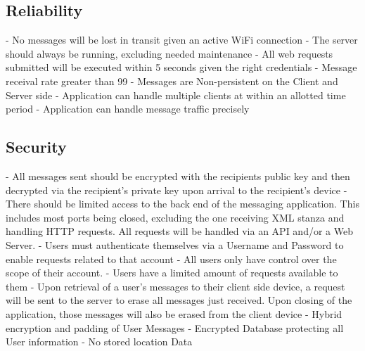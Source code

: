 \documentclass[11pt]{article}
\theoremstyle{plain}
\theoremstyle{definition}
\begin{document}
\subsection{Reliability}
- No messages will be lost in transit given an active WiFi connection
  \newline
- The server should always be running, excluding needed maintenance
  \newline
- All web requests submitted will be executed within 5 seconds given the right 
  credentials
    \newline
- Message receival rate greater than 99 \newline 
- Messages are Non-persistent on the Client and Server side \newline
- Application can handle multiple clients at within an allotted time period \newline
- Application can handle message traffic precisely \newline

\subsection{Security}
- All messages sent should be encrypted with the recipients public key and then decrypted 
  via the recipient's private key upon arrival to the recipient's device
    \newline
- There should be limited access to the back end of the messaging application. This 
  includes most ports being closed, excluding the one receiving XML stanza and handling HTTP requests. All requests will be handled via an API and/or a Web Server.
    \newline
- Users must authenticate themselves via a Username and Password to enable requests related 
  to that account
    \newline
- All users only have control over the scope of their account.
  \newline
- Users have a limited amount of requests available to them
  \newline
- Upon retrieval of a user's messages to their client side device, a request will be sent to the server to erase all messages just received. Upon closing of the application, those messages will also be erased from the client device
  \newline
- Hybrid encryption and padding of User Messages \newline
- Encrypted Database protecting all User information \newline
- No stored location Data \newline
\end{document}

